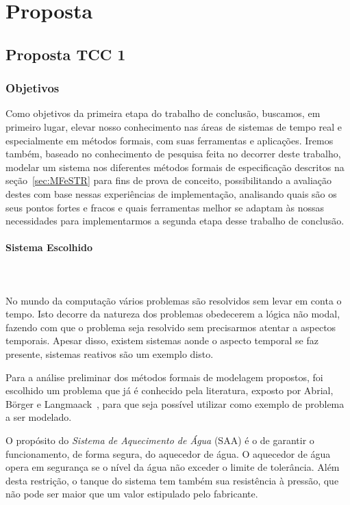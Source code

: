 \section{Proposta}
\subsection{Proposta TCC 1}
\subsubsection{Objetivos}
Como objetivos da primeira etapa do trabalho de conclusão, buscamos, em primeiro lugar,
elevar nosso conhecimento nas áreas de sistemas de tempo real e especialmente
em métodos formais, com suas ferramentas e aplicações. Iremos também,
baseado no conhecimento de pesquisa feita no decorrer deste trabalho, modelar um sistema
nos diferentes métodos formais de especificação descritos na seção~\ref{sec:MFeSTR} para fins de
prova de conceito, possibilitando a avaliação destes com base nessas experiências de implementação,
analisando quais são os seus pontos fortes e fracos e quais ferramentas melhor se adaptam às nossas
necessidades para implementarmos a segunda etapa desse trabalho de conclusão.
\\

\paragraph{Sistema Escolhido}\mbox{} \\\\
No mundo da computação vários problemas são resolvidos sem levar em conta o tempo.
Isto decorre da natureza dos problemas obedecerem a lógica não modal, fazendo com que o
problema seja resolvido sem precisarmos atentar a aspectos temporais. Apesar disso,
existem sistemas aonde o aspecto temporal se faz presente, sistemas reativos são um exemplo disto.

Para a análise preliminar dos métodos formais de modelagem propostos, foi escolhido um problema que
já é conhecido pela literatura, exposto por Abrial, B\"{o}rger e Langmaack~\cite{opac-b1092561},
para que seja possível utilizar como exemplo de problema a ser modelado.

O propósito do \textit{Sistema de Aquecimento de Água} (SAA) é o de garantir o funcionamento,
de forma segura, do aquecedor de água. O aquecedor de água opera em segurança se o nível da água
não exceder o limite de tolerância. Além desta restrição, o tanque do sistema tem também
sua resistência à pressão, que não pode ser maior que um valor estipulado pelo fabricante.

